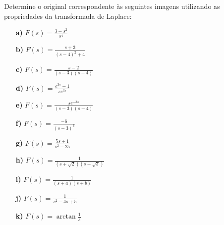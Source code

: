 \linespread{1.5}
Determine o original correspondente às seguintes imagens utilizando as propriedades da transformada de Laplace:
\begin{itemize}
    \item[\textbf{a)}] {\Large $F(s) = \frac{3-s^2}{s^4}$}
    \item[\textbf{b)}] {\Large $F(s) = \frac{s+3}{(s-4)^2 + 4}$}
    \item[\textbf{c)}] {\Large $F(s) = \frac{s-2}{(s-3)(s-4)}$}
    \item[\textbf{d)}] {\Large $F(s) = \frac{e^{3s}-1}{se^{3s}}$}
    \item[\textbf{e)}] {\Large $F(s) = \frac{se^{-3s}}{(s-3)(s-4)}$}
    \item[\textbf{f)}] {\Large $F(s) = \frac{-6}{(s-3)^3}$}
    \item[\textbf{g)}] {\Large $F(s) = \frac{5s + 1}{s^2 -25}$}
    \item[\textbf{h)}] {\Large $F(s) = \frac{1}{(s+\sqrt{2})(s-\sqrt{3})}$}
    \item[\textbf{i)}] {\Large $F(s) = \frac{1}{(s+a)(s+b)}$}
    \item[\textbf{j)}] {\Large $F(s) = \frac{1}{s^2 - 4s + 5}$}
    \item[\textbf{k)}] {\Large $F(s) = \arctan{\frac{1}{s}}$}
\end{itemize}